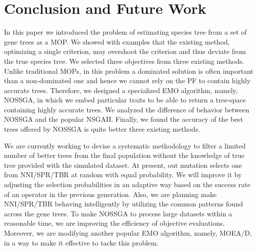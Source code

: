 \section{Conclusion and Future Work}
In this paper we introduced the problem of estimating species tree from a set of gene trees as a MOP. We showed with examples that the existing method, optimizing a single criterion, may overshoot the criterion and thus deviate from the true species tree. We selected three objectives from three existing methods. Unlike traditional MOPs, in this problem a dominated solution is often important than a non-dominated one and hence we cannot rely on the PF to contain highly accurate trees. Therefore, we designed a specialized EMO algorithm, namely, NOSSGA, in which we embed particular traits to be able to return a tree-space containing highly accurate trees. We analyzed the difference of behavior between NOSSGA and the popular NSGAII. Finally, we found the accuracy of the best trees offered by NOSSGA is quite better three existing methods. 

We are currently working to devise a systematic methodology to filter a limited number of better trees from the final population without the knowledge of true tree provided with the simulated dataset. At present, out mutation selects one from NNI/SPR/TBR at random with equal probability. We will improve it by adjusting the selection probabilities in an adaptive way based on the success rate of an operator in the previous generation. Also, we are planning make NNI/SPR/TBR behaving intelligently by utilizing the common patterns found across the gene trees. To make NOSSGA to process large datasets within a reasonable time, we are improving the efficiency of objective evaluations. Moreover, we are modifying another popular EMO algorithm, namely, MOEA/D, in a way to make it effective to tacke this problem.